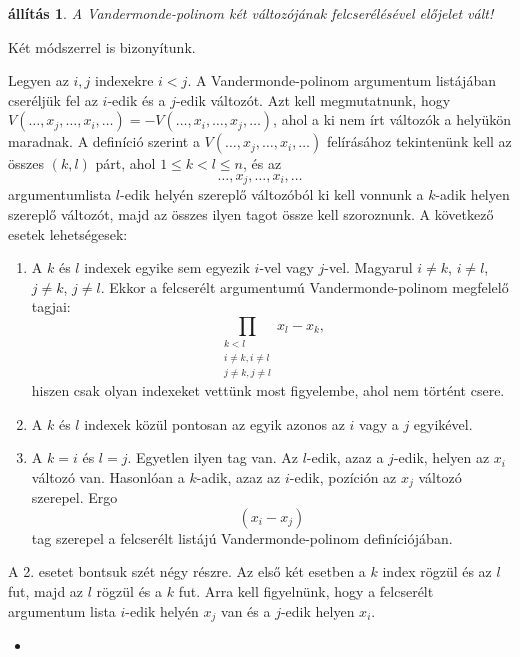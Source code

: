 \documentclass[a4paper, showtrims]{memoir}
\makeatletter
\renewenvironment{proof}[1][\proofname]
    {\par\pushQED{\qed}%
    \normalfont \topsep6\p@\@plus6\p@\relax
    \trivlist
    \item[\hskip\labelsep
        \itshape
    #1\@addpunct{:}]\ignorespaces}
    {\popQED\endtrivlist\@endpefalse}
\theoremstyle{plain}
\newtheorem{proposition}{állítás}[chapter]
\theoremstyle{remark}
\theoremstyle{definition}
\makeatother
\begin{document}
\begin{proposition}
    A Vandermonde-polinom két változójának felcserélésével előjelet vált!
\end{proposition}
Két módszerrel is bizonyítunk.
\begin{proof}
    Legyen az $i,j$ indexekre $i<j$.
    A Vandermonde-polinom argumentum listájában cseréljük fel az $i$-edik és a $j$-edik változót.
    Azt kell megmutatnunk, hogy 
    $V\left( \ldots,x_j,\ldots,x_i,\ldots \right)
    =
    -V\left( \ldots,x_i,\ldots,x_j,\ldots \right)$, ahol a ki nem írt változók a helyükön maradnak.
    A definíció szerint a $V\left( \ldots,x_j,\ldots,x_i,\ldots \right)$ felírásához tekintenünk kell az összes 
    $\left( k,l \right)$ párt, ahol $1\leq k<l\leq n$, és az 
    \[\ldots,x_j,\ldots,x_i,\ldots
    \]
    argumentumlista
    $l$-edik helyén szereplő változóból ki kell vonnunk a $k$-adik helyen szereplő változót, 
    majd az összes ilyen tagot össze kell szoroznunk.
    A következő esetek lehetségesek:
    \begin{enumerate}
        \item A $k$ és $l$ indexek egyike sem egyezik $i$-vel vagy $j$-vel.
            Magyarul $i\neq k$, $i\neq l$, $j\neq k$, $j\neq l$. 
            Ekkor a felcserélt argumentumú Vandermonde-polinom megfelelő tagjai:
            \[
                \prod_{\substack{k<l\\i\neq k,i\neq l\\ j\neq k,j\neq l}}x_l-x_k,
            \]
            hiszen csak olyan indexeket vettünk most figyelembe, ahol nem történt csere.
        \item A $k$ és $l$ indexek közül pontosan az egyik azonos az $i$ vagy a $j$ egyikével.
        \item A $k=i$ és $l=j$.
            Egyetlen ilyen tag van. 
            Az $l$-edik, azaz a $j$-edik, helyen az $x_i$ változó van.
            Hasonlóan a $k$-adik, azaz az $i$-edik, pozíción az $x_j$ változó szerepel. 
            Ergo 
            \[
                \left( x_i-x_j \right)
            \]
            tag szerepel a felcserélt listájú Vandermonde-polinom definíciójában.
    \end{enumerate}
    A 2. esetet bontsuk szét négy részre. 
    Az első két esetben a $k$ index rögzül és az $l$ fut,
    majd az $l$ rögzül és a $k$ fut.
    Arra kell figyelnünk, hogy a felcserélt argumentum lista $i$-edik helyén $x_j$ van és a $j$-edik helyen $x_i$.
    \begin{itemize}
        \item[2.a)]

\end{itemize}
\end{proof}
\end{document}
